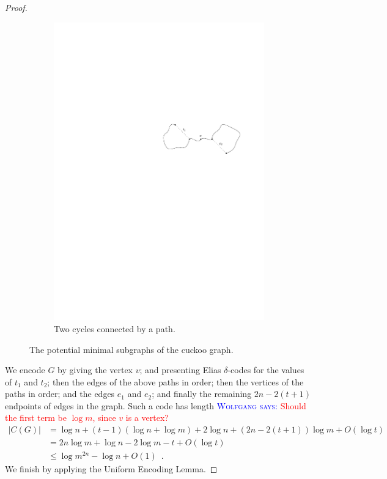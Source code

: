 \documentclass{patmorin}
\newcommand{\aremark}[3]{\textcolor{blue}{\textsc{#1 #2:}}
  \textcolor{red}{\textsf{#3}}}
\newcommand{\wolfgang}[2][says]{\aremark{Wolfgang}{#1}{#2}}
\begin{document}
\begin{proof}
\begin{figure}
\begin{subfigure}[b]{0.6\textwidth}
      \includegraphics{cuckoo2}
      \caption{Two cycles connected by a path.}
    \end{subfigure}
    \caption{The potential minimal subgraphs of the cuckoo graph.}
  \end{figure}

  We encode $G$ by giving the vertex $v$; and presenting Elias
  $\delta$-codes for the values of $t_1$ and $t_2$; then the edges of
  the above paths in order; then the vertices of the paths in order;
  and the edges $e_1$ and $e_2$; and finally the remaining $2n - 2(t +
  1)$ endpoints of edges in the graph. Such a code has length
  \wolfgang{Should the first term be $\log m$, since $v$ is a vertex?}
  \begin{align*}
    |C(G)| &= \log n + (t - 1)(\log n + \log m) + 2\log n + (2n - 2(t + 1))\log m + O(\log t) \\
           &= 2n \log m + \log n - 2\log m - t + O(\log t) \\
           &\leq \log m^{2n} - \log n + O(1) \enspace .
  \end{align*}
  We finish by applying the Uniform Encoding Lemma.
\end{proof}
\end{document}
